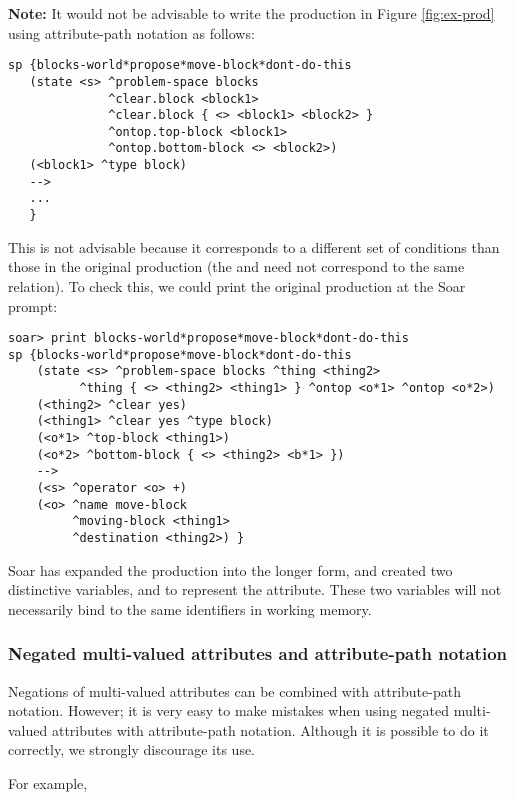 \textbf{Note:} It would not be advisable to write the production in Figure \ref{fig:ex-prod} using attribute-path notation as follows:

\begin{verbatim}
sp {blocks-world*propose*move-block*dont-do-this
   (state <s> ^problem-space blocks
              ^clear.block <block1>
              ^clear.block { <> <block1> <block2> }
              ^ontop.top-block <block1>
              ^ontop.bottom-block <> <block2>)
   (<block1> ^type block)
   -->
   ...
   }
\end{verbatim}

This is not advisable because it corresponds to a different set of conditions than those in the original production (the  and  need not correspond to the same  relation). To check this, we could print the original production at the Soar prompt:

\begin{verbatim}
soar> print blocks-world*propose*move-block*dont-do-this
sp {blocks-world*propose*move-block*dont-do-this
    (state <s> ^problem-space blocks ^thing <thing2>
          ^thing { <> <thing2> <thing1> } ^ontop <o*1> ^ontop <o*2>)
    (<thing2> ^clear yes)
    (<thing1> ^clear yes ^type block)
    (<o*1> ^top-block <thing1>)
    (<o*2> ^bottom-block { <> <thing2> <b*1> })
    -->
    (<s> ^operator <o> +)
    (<o> ^name move-block 
         ^moving-block <thing1> 
         ^destination <thing2>) }
\end{verbatim}

Soar has expanded the production into the longer form, and created two distinctive variables,  and  to represent the  attribute. These two variables will not necessarily bind to the same identifiers in working memory.

\subsubsection*{Negated multi-valued attributes and attribute-path notation}

Negations of multi-valued attributes can be combined with attribute-path notation. However; it is very easy to make mistakes when using negated multi-valued attributes with attribute-path notation. Although it is possible to do it correctly, we strongly discourage its use.

For example, 

